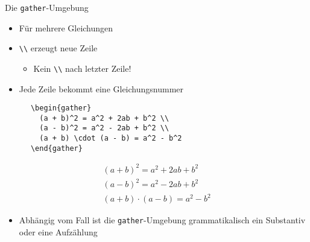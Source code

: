 \begin{frame}[fragile]{Die \texttt{gather}-Umgebung}
  \begin{itemize}
    \item Für mehrere Gleichungen
    \item \verb+\\+ erzeugt neue Zeile
      \begin{itemize}
        \item Kein \verb+\\+ nach letzter Zeile!
      \end{itemize}
    \item Jede Zeile bekommt eine Gleichungsnummer
  \end{itemize}
  \begin{CodeExample}{0.54}
    \begin{lstlisting}
      \begin{gather}
        (a + b)^2 = a^2 + 2ab + b^2 \\
        (a - b)^2 = a^2 - 2ab + b^2 \\
        (a + b) \cdot (a - b) = a^2 - b^2
      \end{gather}
    \end{lstlisting}
  \CodeResult
    \begin{gather}
      (a + b)^2 = a^2 + 2ab + b^2 \\
      (a - b)^2 = a^2 - 2ab + b^2 \\
      (a + b) \cdot (a - b) = a^2 - b^2
    \end{gather}
  \end{CodeExample}

  \vspace{1em}
  \begin{itemize}
    \item Abhängig vom Fall ist die \texttt{gather}-Umgebung grammatikalisch ein Substantiv oder eine Aufzählung
  \end{itemize}
\end{frame}

